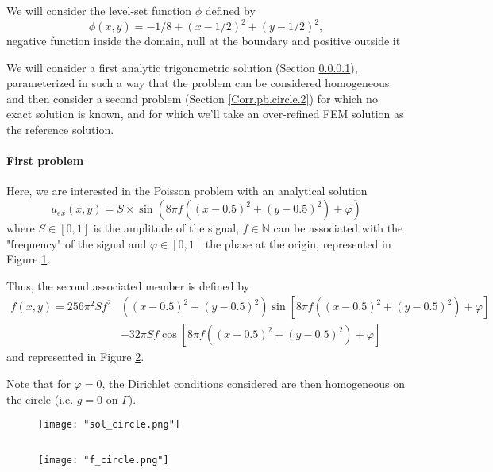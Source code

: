 We will consider the level-set function $\phi$ defined by
\begin{equation*}
	\phi(x,y)=-1/8+(x-1/2)^2+(y-1/2)^2,
\end{equation*}
negative function inside the domain, null at the boundary and positive outside it
	
We will consider a first analytic trigonometric solution (Section \ref{Corr.pb.circle.1}), parameterized in such a way that the problem can be considered homogeneous and then consider a second problem (Section \ref{Corr.pb.circle.2}) for which no exact solution is known, and for which we'll take an over-refined FEM solution as the reference solution.

\paragraph{First problem} \label{Corr.pb.circle.1}

Here, we are interested in the Poisson problem with an analytical solution
\begin{equation*}
	u_{ex}(x,y)=S\times\sin\left(8\pi f\left((x-0.5)^2+(y-0.5)^2\right)+\varphi\right)
\end{equation*}
where $S\in[0,1]$ is the amplitude of the signal, $f\in\mathbb{N}$ can be associated with the "frequency" of the signal and $\varphi\in[0,1]$ the phase at the origin, represented in Figure \ref{sol_circle}.

Thus, the second associated member is defined by
\begin{align*}
	f(x,y)=256\pi^2 S f^2&\left((x-0.5)^2+(y-0.5)^2\right)\sin\left[8\pi f\left((x-0.5)^2+(y-0.5)^2\right) + \varphi\right] \\
	&- 32\pi S f\cos\left[8\pi f \left((x-0.5)^2+(y-0.5)^2\right) + \varphi\right]
\end{align*}
and represented in Figure \ref{f_circle}.

\begin{Rem}
	Note that for $\varphi=0$, the Dirichlet conditions considered are then homogeneous on the circle (i.e. $g=0$ on $\Gamma$).
\end{Rem}

\begin{minipage}{0.48\linewidth}
	\begin{figure}[H]
		\centering
		\texttt{[image: "sol\_circle.png"]}
		\label{sol_circle}
	\end{figure} 
\end{minipage} $\qquad$
\begin{minipage}{0.48\linewidth}
	\begin{figure}[H]
		\centering
		\texttt{[image: "f\_circle.png"]}
		\label{f_circle}
	\end{figure} 
\end{minipage}

